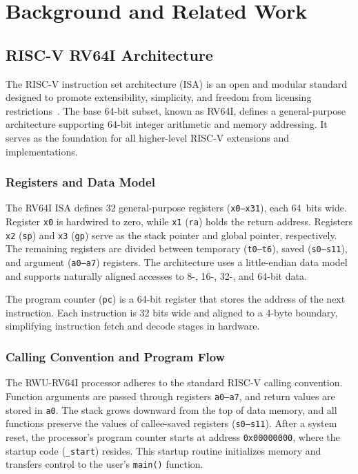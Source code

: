 \chapter{Background and Related Work}
\label{ch:background}

\section{RISC-V RV64I Architecture}
The RISC-V instruction set architecture (ISA) is an open and modular standard designed to promote extensibility, simplicity, and freedom from licensing restrictions~\cite{riscv-spec}.  
The base 64-bit subset, known as RV64I, defines a general-purpose architecture supporting 64-bit integer arithmetic and memory addressing.  
It serves as the foundation for all higher-level RISC-V extensions and implementations.

\subsection{Registers and Data Model}
The RV64I ISA defines 32 general-purpose registers (\texttt{x0--x31}), each 64~bits wide.  
Register \texttt{x0} is hardwired to zero, while \texttt{x1} (\texttt{ra}) holds the return address.  
Registers \texttt{x2} (\texttt{sp}) and \texttt{x3} (\texttt{gp}) serve as the stack pointer and global pointer, respectively.  
The remaining registers are divided between temporary (\texttt{t0--t6}), saved (\texttt{s0--s11}), and argument (\texttt{a0--a7}) registers.  
The architecture uses a little-endian data model and supports naturally aligned accesses to 8-, 16-, 32-, and 64-bit data.

The program counter (\texttt{pc}) is a 64-bit register that stores the address of the next instruction.  
Each instruction is 32 bits wide and aligned to a 4-byte boundary, simplifying instruction fetch and decode stages in hardware.

\subsection{Calling Convention and Program Flow}
The RWU-RV64I processor adheres to the standard RISC-V calling convention.  
Function arguments are passed through registers \texttt{a0--a7}, and return values are stored in \texttt{a0}.  
The stack grows downward from the top of data memory, and all functions preserve the values of callee-saved registers (\texttt{s0--s11}).  
After a system reset, the processor’s program counter starts at address \texttt{0x00000000}, where the startup code (\texttt{\_start}) resides.  
This startup routine initializes memory and transfers control to the user’s \texttt{main()} function.

